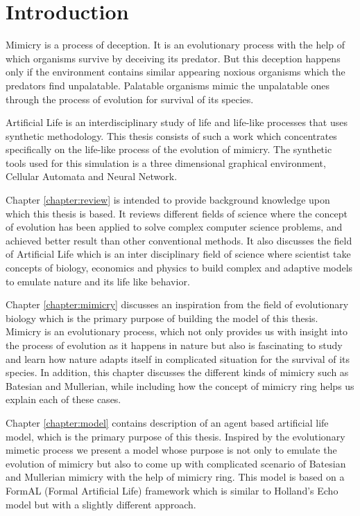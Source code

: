 \chapter{Introduction}
\label{chapter:introduction}

Mimicry is a process of deception. It is an evolutionary process with the help of which organisms survive by deceiving its predator. But this deception happens only if the environment contains similar appearing noxious organisms which the predators find unpalatable. Palatable organisms mimic the unpalatable ones through the process of evolution for survival of its species.

Artificial Life is an interdisciplinary study of life and life-like processes that uses synthetic methodology. This thesis consists of such a work which concentrates specifically on the life-like process of the evolution of mimicry. The synthetic tools used for this simulation is a three dimensional graphical environment, Cellular Automata and Neural Network. 

Chapter \ref{chapter:review} is intended to provide background knowledge upon which this thesis is based. It reviews different fields of science where the concept of evolution has been applied to solve complex computer science problems, and achieved better result than other conventional methods. It also discusses the field of Artificial Life which is an inter disciplinary field of science where scientist take concepts of biology, economics and physics to build complex and adaptive models to emulate nature and its life like behavior.

Chapter \ref{chapter:mimicry} discusses an inspiration from the field of evolutionary biology which is the primary purpose of building the model of this thesis. Mimicry is an evolutionary process, which not only provides us with insight into the process of evolution as it happens in nature but also is fascinating to study and learn how nature adapts itself in complicated situation for the survival of its species. In addition, this chapter discusses the different kinds of mimicry such as Batesian and Mullerian, while including how the concept of mimicry ring helps us explain each of these cases. 

Chapter \ref{chapter:model} contains description of an agent based artificial life model, which is the primary purpose of this thesis. Inspired by the evolutionary mimetic process we present a model whose purpose is not only to emulate the evolution of mimicry but also to come up with complicated scenario of Batesian and Mullerian mimicry with the help of mimicry ring. This model is based on a FormAL (Formal Artificial Life) framework which is similar to Holland's Echo model but with a slightly different approach. 

